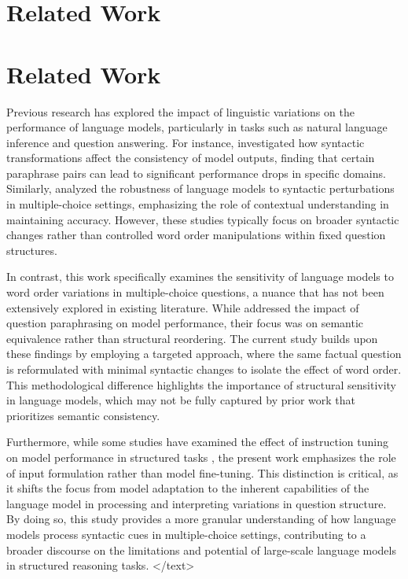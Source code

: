 \documentclass{article}
\begin{document}
\section{Related Work}
\section{Related Work}

Previous research has explored the impact of linguistic variations on the performance of language models, particularly in tasks such as natural language inference and question answering. For instance, \citet{DBLP:journals/corr/abs-2109-07578} investigated how syntactic transformations affect the consistency of model outputs, finding that certain paraphrase pairs can lead to significant performance drops in specific domains. Similarly, \citet{DBLP:journals/corr/abs-2110-08372} analyzed the robustness of language models to syntactic perturbations in multiple-choice settings, emphasizing the role of contextual understanding in maintaining accuracy. However, these studies typically focus on broader syntactic changes rather than controlled word order manipulations within fixed question structures. 

In contrast, this work specifically examines the sensitivity of language models to word order variations in multiple-choice questions, a nuance that has not been extensively explored in existing literature. While \citet{DBLP:journals/corr/abs-2004-09519} addressed the impact of question paraphrasing on model performance, their focus was on semantic equivalence rather than structural reordering. The current study builds upon these findings by employing a targeted approach, where the same factual question is reformulated with minimal syntactic changes to isolate the effect of word order. This methodological difference highlights the importance of structural sensitivity in language models, which may not be fully captured by prior work that prioritizes semantic consistency. 

Furthermore, while some studies have examined the effect of instruction tuning on model performance in structured tasks \citep{DBLP:journals/corr/abs-2106-11959}, the present work emphasizes the role of input formulation rather than model fine-tuning. This distinction is critical, as it shifts the focus from model adaptation to the inherent capabilities of the language model in processing and interpreting variations in question structure. By doing so, this study provides a more granular understanding of how language models process syntactic cues in multiple-choice settings, contributing to a broader discourse on the limitations and potential of large-scale language models in structured reasoning tasks.
</text>
\end{document}
